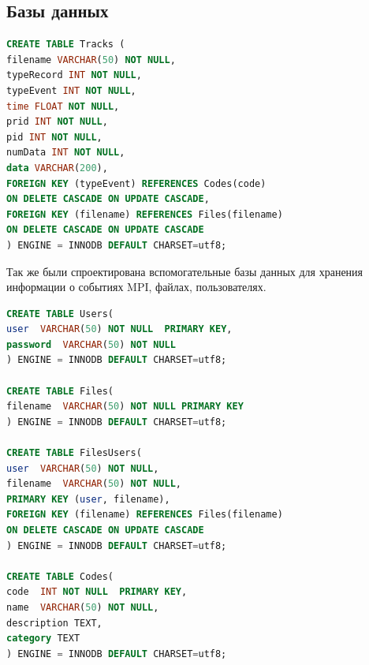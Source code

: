 \subsection{Базы данных}
\begin{lstlisting}[language=SQL]
CREATE TABLE Tracks ( 
filename VARCHAR(50) NOT NULL,
typeRecord INT NOT NULL,
typeEvent INT NOT NULL,
time FLOAT NOT NULL,
prid INT NOT NULL,
pid INT NOT NULL,
numData INT NOT NULL,
data VARCHAR(200),
FOREIGN KEY (typeEvent) REFERENCES Codes(code) 
ON DELETE CASCADE ON UPDATE CASCADE,
FOREIGN KEY (filename) REFERENCES Files(filename) 
ON DELETE CASCADE ON UPDATE CASCADE
) ENGINE = INNODB DEFAULT CHARSET=utf8;
\end{lstlisting}
Так же были спроектирована вспомогательные базы данных для хранения информации о событиях MPI, файлах, пользователях.
\begin{lstlisting}[language=SQL]
CREATE TABLE Users(
user  VARCHAR(50) NOT NULL  PRIMARY KEY,
password  VARCHAR(50) NOT NULL
) ENGINE = INNODB DEFAULT CHARSET=utf8;

CREATE TABLE Files(
filename  VARCHAR(50) NOT NULL PRIMARY KEY
) ENGINE = INNODB DEFAULT CHARSET=utf8;

CREATE TABLE FilesUsers(
user  VARCHAR(50) NOT NULL,
filename  VARCHAR(50) NOT NULL,
PRIMARY KEY (user, filename), 
FOREIGN KEY (filename) REFERENCES Files(filename)
ON DELETE CASCADE ON UPDATE CASCADE 
) ENGINE = INNODB DEFAULT CHARSET=utf8;

CREATE TABLE Codes(
code  INT NOT NULL  PRIMARY KEY,
name  VARCHAR(50) NOT NULL,
description TEXT,
category TEXT
) ENGINE = INNODB DEFAULT CHARSET=utf8;

\end{lstlisting} 


